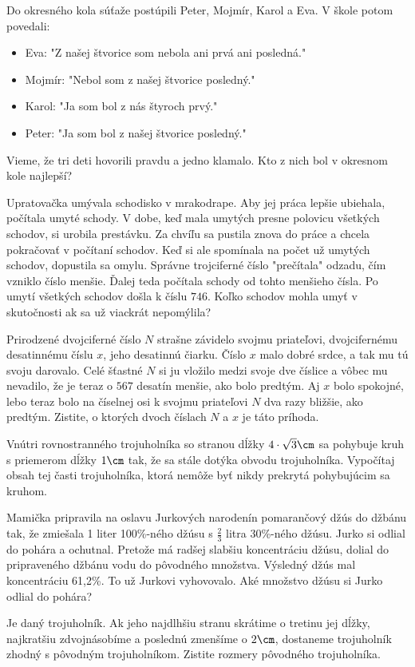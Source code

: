 {%
Do okresného kola súťaže postúpili Peter, Mojmír, Karol a Eva. V škole potom povedali:
\begin{itemize}
\item Eva: "Z našej štvorice som nebola ani prvá ani posledná."
\item Mojmír: "Nebol som z našej štvorice posledný."
\item Karol: "Ja som bol z nás štyroch prvý."
\item Peter: "Ja som bol z našej štvorice posledný."
\end{itemize}
Vieme, že tri deti hovorili pravdu a jedno klamalo. Kto z nich bol v okresnom kole najlepší?}

{%
Upratovačka umývala schodisko v mrakodrape. Aby jej práca lepšie ubiehala, počítala umyté
schody. V dobe, keď mala umytých presne polovicu všetkých schodov, si urobila prestávku.
Za chvíľu sa pustila znova do práce a chcela pokračovať v počítaní schodov. Keď si ale
spomínala na počet už umytých schodov, dopustila sa omylu. Správne trojciferné číslo
"prečítala" odzadu, čím vzniklo číslo menšie. Ďalej teda počítala schody od tohto menšieho
čísla. Po umytí všetkých schodov došla k číslu $746$. Koľko schodov mohla umyť
v skutočnosti ak sa už viackrát nepomýlila?}

{%
Prirodzené dvojciferné číslo $N$ strašne závidelo svojmu priateľovi, dvojcifernému desatinnému
číslu $x$, jeho desatinnú čiarku. Číslo $x$ malo dobré srdce, a tak mu tú svoju darovalo. Celé šťastné $N$ si ju
vložilo medzi svoje dve číslice a vôbec mu nevadilo, že je teraz o $567$ desatín menšie, ako bolo
predtým. Aj $x$ bolo spokojné, lebo teraz bolo na číselnej osi k svojmu priateľovi $N$ dva razy
bližšie, ako predtým. Zistite, o ktorých dvoch číslach $N$ a $x$ je táto príhoda.}

{%
Vnútri rovnostranného trojuholníka so stranou dĺžky $4\cdot\sqrt3\cm$ sa pohybuje kruh s priemerom
dĺžky $1\cm$ tak, že sa stále dotýka obvodu trojuholníka. Vypočítaj obsah tej časti trojuholníka,
ktorá nemôže byť nikdy prekrytá pohybujúcim sa kruhom.}

{%
Mamička pripravila na oslavu Jurkových narodenín pomarančový džús do džbánu tak, že
zmiešala 1 liter 100\%-ného džúsu s $\frac23$ litra 30\%-ného džúsu. Jurko si odlial do pohára
a ochutnal. Pretože má radšej slabšiu koncentráciu džúsu, dolial do pripraveného džbánu vodu do
pôvodného množstva. Výsledný džús mal koncentráciu 61{,}2\%. To už Jurkovi vyhovovalo. Aké
množstvo džúsu si Jurko odlial do pohára?}

{%
Je daný trojuholník. Ak jeho najdlhšiu stranu skrátime o tretinu jej dĺžky, najkratšiu
zdvojnásobíme a poslednú zmenšíme o $2\cm$, dostaneme trojuholník zhodný s pôvodným
trojuholníkom. Zistite rozmery pôvodného trojuholníka.}

